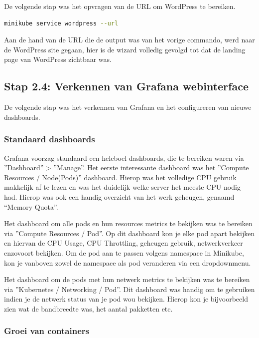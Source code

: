 De volgende stap was het opvragen van de URL om WordPress te bereiken.

\begin{lstlisting}[language=bash,caption={URL WordPress}]
    minikube service wordpress --url
\end{lstlisting}

Aan de hand van de URL die de output was van het vorige commando, werd naar de WordPress site gegaan, hier is de wizard volledig gevolgd tot dat de landing page van WordPress zichtbaar was.

\subsection{Stap 2.4: Verkennen van Grafana webinterface}

De volgende stap was het verkennen van Grafana en het configureren van nieuwe dashboards.

\subsubsection{Standaard dashboards}

Grafana voorzag standaard een heleboel dashboards, die te bereiken waren via ''Dashboard'' > ''Manage''. Het eerste interessante dashboard was het ''Compute Resources / Node(Pods)'' dashboard. Hierop was het volledige CPU gebruik makkelijk af te lezen en was het duidelijk welke server het meeste CPU nodig had. Hierop was ook een handig overzicht van het werk geheugen, genaamd “Memory Quota”.

Het dashboard om alle pods en hun resources metrics te bekijken was te bereiken via ''Compute Resources / Pod''. Op dit dashboard kon je elke pod apart bekijken en hiervan de CPU Usage, CPU Throttling, geheugen gebruik, netwerkverkeer enzovoort bekijken. Om de pod aan te passen volgens namespace in Minikube, kon je vanboven zowel de namespace als pod veranderen via een dropdownmenu. 

Het dashboard om de pods met hun netwerk metrics te bekijken was te bereiken via ''Kubernetes / Networking / Pod''. Dit dashboard was handig om te gebruiken indien je de netwerk status van je pod wou bekijken. Hierop kon je bijvoorbeeld zien wat de bandbreedte was, het aantal pakketten etc. 

\subsubsection{Groei van containers}\label{sssec:Groeivancontainers}

